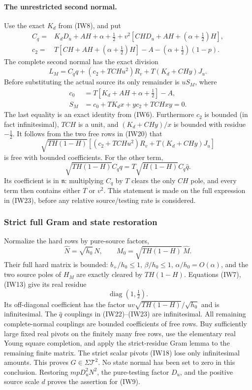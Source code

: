 \paragraph{The unrestricted second normal.}
Use the exact $K_d$ from (IW8), and put
\[
\begin{split}
 C_q={}&K_dD_u+AH+\alpha+\tfrac12
        +v^2[CHD_u+AH+(\alpha+\tfrac12)H],\\
 c_2={}&T[CH+AH+(\alpha+\tfrac12)H]
                      -A-(\alpha+\tfrac12)(1-p).
\end{split}
\]
The complete second normal has the exact division
\[
 L_M=C_qq+(c_2+TCHu^2)R_v+T(K_d+CHy)J_u.             \tag{IW23}
\]
Before substituting the actual source its only remainder is $uS_M$,
where
\[
\begin{split}
 c_0&=T[K_d+AH+\alpha+\tfrac12]-A,\\
 S_M&=c_0+TK_dx+yc_2+TCHxy=0.
\end{split}
\]
The last equality is an exact identity from (IW6). Furthermore
$c_2$ is bounded (in fact infinitesimal), $TCH$ is a unit, and
$(K_d+CHy)/x$ is bounded with residue $-\tfrac12$.
It follows from the two free rows in (IW20) that
\[
 \sqrt{TH(1-H)}[(c_2+TCHu^2)R_v+T(K_d+CHy)J_u]
\]
is free with bounded coefficients. For the other term,
\[
 \sqrt{TH(1-H)}C_qq
     =T\sqrt{H(1-H)}C_q\widehat q.
\]
Its coefficient is in $\mathfrak n$: multiplying $C_q$ by $T$
clears the only $CH$ pole, and every term then contains either
$T$ or $v^2$. This statement is made on the full expression in
(IW23), before any relative source/testing rate is considered.

\subsubsection*{Strict full Gram and state restoration}

Normalize the hard rows by pure-source factors,
\[
 \widehat N=\sqrt{h_0}\,N,\qquad
 M_0=\sqrt{TH(1-H)}\,\widehat M.
\]
Their full hard matrix is bounded: $b_+/h_0\leq1$,
$\beta/h_0\leq1$, $\alpha/h_0=O(\alpha)$, and the two
source poles of $H_M$ are exactly cleared by $TH(1-H)$.
Equations (IW7), (IW13) give its real residue
\[
                           \operatorname{diag}(1,\tfrac12).
                                                               \tag{IW24}
\]
Its off-diagonal coefficient has the factor
$uv\sqrt{TH(1-H)}/\sqrt{h_0}$ and is infinitesimal.
The $\widehat q$ couplings in (IW22)--(IW23) are infinitesimal.
All remaining complete-normal couplings are bounded coefficients
of free rows. Buy sufficiently large fixed real pivots on the
finitely many free rows, use the elementary real Young square
completion, and apply the strict-residue Gram lemma to the
remaining finite matrix. The strict scalar pivots (IW18) lose only
infinitesimal amounts. This proves $G\in\Sigma\mathcal T^2$.
No state normal has been set to zero in this conclusion.
Restoring $mpD_u^2N^2$, the pure-testing factor $D_u$, and the
positive source scale $d$ proves the assertion for (IW9).

